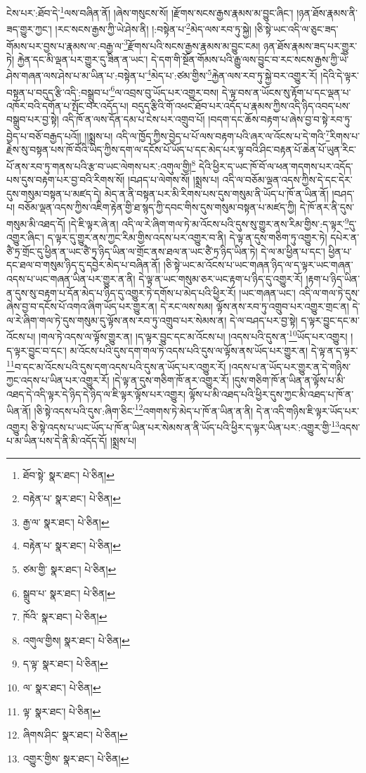 ངེས་པར་:ཐོབ་དེ་\footnote{ཐོབ་སྟེ་  སྣར་ཐང་།  པེ་ཅིན། }ལས་བཞིན་ནོ། །ཞེས་གསུངས་སོ། །རྫོགས་སངས་རྒྱས་རྣམས་མ་བྱུང་ཞིང་། །ཉན་ཐོས་རྣམས་ནི་ཟད་གྱུར་ཀྱང་། །རང་སངས་རྒྱས་ཀྱི་ཡེ་ཤེས་ནི། །:བསྟེན་པ་\footnote{བརྟེན་པ་  སྣར་ཐང་།  པེ་ཅིན། }མེད་ལས་རབ་ཏུ་སྐྱེ། །ཅི་སྟེ་ཡང་འདི་ལ་ཅུང་ཟད་གོམས་པར་བྱས་པ་རྣམས་ལ་:བརྒྱ་ལ་\footnote{རྒྱ་ལ་  སྣར་ཐང་།  པེ་ཅིན། }རྫོགས་པའི་སངས་རྒྱས་རྣམས་མ་བྱུང་ངམ། ཉན་ཐོས་རྣམས་ཟད་པར་གྱུར་ཏེ། རྐྱེན་དང་མི་ལྡན་པར་གྱུར་དུ་ཟིན་ན་ཡང་། དེ་དག་གི་སྔོན་གོམས་པའི་རྒྱུ་ལས་བྱུང་བ་རང་སངས་རྒྱས་ཀྱི་ཡེ་ཤེས་གཞན་ལས་ཤེས་པ་མ་ཡིན་པ་:བསྟེན་པ་\footnote{བརྟེན་པ་  སྣར་ཐང་།  པེ་ཅིན། }མེད་པ་:ཙམ་གྱིས་\footnote{ཙམ་གྱི་  སྣར་ཐང་།  པེ་ཅིན། }རྐྱེན་ལས་རབ་ཏུ་སྐྱེ་བར་འགྱུར་རོ། །དེའི་དེ་ལྟར་བསྟན་པ་བདུད་རྩི་འདི་:བསྒྲུབ་པ་\footnote{སྒྲུབ་པ་  སྣར་ཐང་།  པེ་ཅིན། }ལ་འབྲས་བུ་ཡོད་པར་འགྱུར་བས། དེ་ལྟ་བས་ན་ཡོངས་སུ་རྟོག་པ་དང་ལྡན་པ་འཁོར་བའི་དགོན་པ་སྤོང་བར་འདོད་པ། བདུད་རྩིའི་གོ་འཕང་ཐོབ་པར་འདོད་པ་རྣམས་ཀྱིས་འདི་ཉིད་འབད་པས་བསྒྲུབ་པར་བྱ་སྟེ། འདི་ཁོ་ན་ལས་དོན་དམ་པ་ངེས་པར་འགྲུབ་པོ། །བདག་དང་ཆོས་བརྟག་པ་ཞེས་བྱ་བ་སྟེ་རབ་ཏུ་བྱེད་པ་བཅོ་བརྒྱད་པའོ།། །།སྨྲས་པ། འདི་ལ་ཁྱོད་ཀྱིས་བྱེད་པ་པོ་ལས་བརྟག་པའི་ཞར་ལ་འོངས་པ་དེ་གའི་\footnote{ཁོའི་  སྣར་ཐང་།  པེ་ཅིན། }རིགས་པ་རྗེས་སུ་བསྟན་པས་ཁོ་བོའི་ཡིད་ཀྱིས་དག་ལ་དངོས་པོ་ཡོད་པ་དང་མེད་པར་ལྟ་བའི་ཤིང་བརྟན་པོ་ཆེན་པོ་ཡུན་རིང་པོ་ནས་རབ་ཏུ་གནས་པའི་རྩ་བ་ཡང་ལེགས་པར་:འགུལ་གྱི།\footnote{འགུལ་གྱིས།  སྣར་ཐང་།  པེ་ཅིན། } དེའི་ཕྱིར་ད་ཡང་ཁོ་བོ་ལ་ཕན་གདགས་པར་འདོད་པས་དུས་བརྟག་པར་བྱ་བའི་རིགས་སོ། །བཤད་པ་ལེགས་སོ། །སྨྲས་པ། འདི་ལ་བཅོམ་ལྡན་འདས་ཀྱིས་དེ་དང་དེར་དུས་གསུམ་བསྟན་པ་མཛད་དེ། མེད་ན་ནི་བསྟན་པར་མི་རིགས་པས་དུས་གསུམ་ནི་ཡོད་པ་ཁོ་ན་ཡིན་ནོ། །བཤད་པ། བཅོམ་ལྡན་འདས་ཀྱིས་འཇིག་རྟེན་གྱི་ཐ་སྙད་ཀྱི་དབང་གིས་དུས་གསུམ་བསྟན་པ་མཛད་ཀྱི། དེ་ཁོ་ནར་ནི་དུས་གསུམ་མི་འཐད་དོ། །དེ་ཇི་ལྟར་ཞེ་ན། འདི་ལ་རེ་ཞིག་གལ་ཏེ་མ་འོངས་པའི་དུས་སུ་གྱུར་ནས་རིམ་གྱིས་:ད་ལྟར་\footnote{ད་ལྟ་  སྣར་ཐང་།  པེ་ཅིན། }དུ་འགྱུར་ཞིང་། ད་ལྟར་དུ་གྱུར་ནས་ཀྱང་རིམ་གྱིས་འདས་པར་འགྱུར་བ་ནི། དེ་ལྟ་ན་དུས་གཅིག་ཏུ་འགྱུར་ཏེ། དཔེར་ན་ཙཻ་ཏྲ་གྲོང་དུ་ཕྱིན་ན་ཡང་ཙཻ་ཏྲ་ཉིད་ཡིན་ལ་གྲོང་ནས་ཐལ་ན་ཡང་ཙཻ་ཏྲ་ཉིད་ཡིན་ཏེ། དེ་ལ་མ་ཕྱིན་པ་དང་། ཕྱིན་པ་དང་ཐལ་བ་གསུམ་ཉིད་དུ་དབྱེར་མེད་པ་བཞིན་ནོ། །ཅི་སྟེ་ཡང་མ་འོངས་པ་ཡང་གཞན་ཉིད་ལ་ད་ལྟར་ཡང་གཞན་འདས་པ་ཡང་གཞན་ཡིན་པར་གྱུར་ན་ནི། དེ་ལྟ་ན་ཡང་གསུམ་ཅར་ཡང་རྟག་པ་ཉིད་དུ་འགྱུར་རོ། །རྟག་པ་ཉིད་ཡིན་ན་དུས་སུ་བརྟག་པ་དོན་མེད་པ་ཉིད་དུ་འགྱུར་ཏེ་དགོས་པ་མེད་པའི་ཕྱིར་རོ། །ཡང་གཞན་ཡང་། འདི་ལ་གལ་ཏེ་དུས་ཞེས་བྱ་བ་དངོས་པོ་འགའ་ཞིག་ཡོད་པར་གྱུར་ན། དེ་རང་ལས་སམ། ལྟོས་ནས་རབ་ཏུ་འགྲུབ་པར་འགྱུར་གྲང་ན། དེ་ལ་རེ་ཞིག་གལ་ཏེ་དུས་གསུམ་དུ་ལྟོས་ནས་རབ་ཏུ་འགྲུབ་པར་སེམས་ན། དེ་ལ་བཤད་པར་བྱ་སྟེ། ད་ལྟར་བྱུང་དང་མ་འོངས་པ། །གལ་ཏེ་འདས་ལ་ལྟོས་གྱུར་ན། །ད་ལྟར་བྱུང་དང་མ་འོངས་པ། །འདས་པའི་དུས་ན་\footnote{ལ་  སྣར་ཐང་།  པེ་ཅིན། }ཡོད་པར་འགྱུར། །ད་ལྟར་བྱུང་བ་དང་། མ་འོངས་པའི་དུས་དག་གལ་ཏེ་འདས་པའི་དུས་ལ་ལྟོས་ནས་ཡོད་པར་གྱུར་ན། དེ་ལྟ་ན་ད་ལྟར་\footnote{ལྟ་  སྣར་ཐང་།  པེ་ཅིན། }བ་དང་མ་འོངས་པའི་དུས་དག་འདས་པའི་དུས་ན་ཡོད་པར་འགྱུར་རོ། །འདས་པ་ན་ཡོད་པར་གྱུར་ན་དེ་གཉིས་ཀྱང་འདས་པ་ཡིན་པར་འགྱུར་རོ། །དེ་ལྟ་ན་དུས་གཅིག་ཁོ་ནར་འགྱུར་རོ། །དུས་གཅིག་ཁོ་ན་ཡིན་ན་ལྟོས་པ་མི་འཐད་དེ་འདི་ལྟར་དེ་ཉིད་དེ་ཉིད་ལ་ཇི་ལྟར་ལྟོས་པར་འགྱུར། ལྟོས་པ་མི་འཐད་པའི་ཕྱིར་དུས་ཀྱང་མི་འཐད་པ་ཁོ་ན་ཡིན་ནོ། །ཅི་སྟེ་འདས་པའི་དུས་:ཞིག་ཅིང་\footnote{ཞིགས་ཤིང་  སྣར་ཐང་།  པེ་ཅིན། }འགགས་ཏེ་མེད་པ་ཁོ་ན་ཡིན་ན་ནི། དེ་ན་འདི་གཉིས་ཇི་ལྟར་ཡོད་པར་འགྱུར། ཅི་སྟེ་འདས་པ་ཡང་ཡོད་པ་ཁོ་ན་ཡིན་པར་སེམས་ན་ནི་ཡོད་པའི་ཕྱིར་ད་ལྟར་ཡིན་པར་:འགྱུར་གྱི་\footnote{འགྱུར་གྱིས་  སྣར་ཐང་།  པེ་ཅིན། }འདས་པ་མ་ཡིན་པས་དེ་ནི་མི་འདོད་དོ། །སྨྲས་པ། 